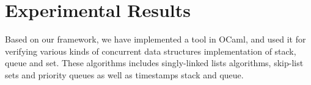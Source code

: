 \section{Experimental Results}
\label{section:experiments}
\newcommand{\emm}{(emm)}

 Based on our framework, we have implemented a tool in OCaml, and used it for verifying various kinds of concurrent data structures implementation of stack, queue and set. These algorithms includes singly-linked lists algorithms, skip-list sets and priority queues as well as timestamps stack and queue.  

